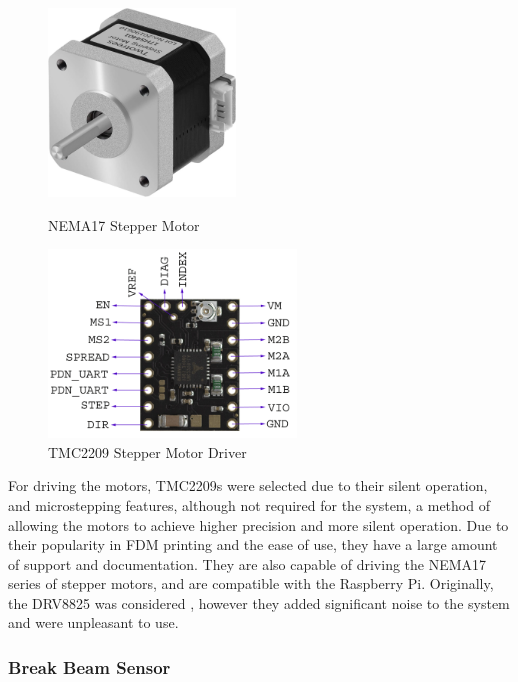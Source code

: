 \begin{figure}[H]
    \hfill
    \begin{minipage}[t]{0.45\textwidth}
      \centering
      \includegraphics[width=\textwidth,height=5cm, keepaspectratio]{imgs/parts/nema17.jpg}
      \caption{NEMA17 Stepper Motor \cite{nema17}}
      \label{fig:nema17}
    \end{minipage}
    \hfill
    \begin{minipage}[t]{0.45\textwidth}
        \centering
        \includegraphics[width=\textwidth,height=5cm, keepaspectratio]{imgs/parts/tmc2209.png}
        \caption{TMC2209 Stepper Motor Driver \cite{tmc2209}}
        \label{fig:tmc2209}
      \end{minipage}
      \hfill
\end{figure}

For driving the motors, TMC2209s were selected due to their silent operation, and microstepping features, although not required for the system, a method of allowing the motors to achieve higher precision and more silent operation. Due to their popularity in FDM printing and the ease of use, they have a large amount of support and documentation. They are also capable of driving the NEMA17 series of stepper motors, and are compatible with the Raspberry Pi. Originally, the DRV8825 was considered \cite{drv8825}, however they added significant noise to the system and were unpleasant to use.
\subsubsection{Break Beam Sensor}
\label{sec:break-beam-sensor}

